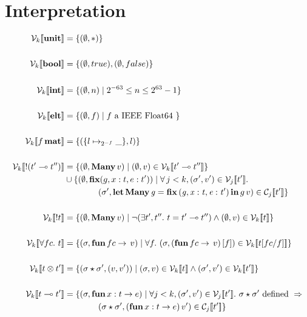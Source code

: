 \section{Interpretation}

\begin{align*}
  \V{k}{ \Unit } &= \{ (\empH, \ast) \} \\
\\
    \V{k}{ \Bool } &= \{ (\empH, true), (\empH, false) \} \\
\\
    \V{k}{ \Int } &= \{ (\empH, n) \mid 2^{-63} \leq n \leq 2^{63} -1 \} \\
\\
    \V{k}{ \Elt } &= \{ (\empH, f) \mid f \textrm{ a IEEE Float64 } \} \\
\\
    \V{k}{ f \, \Mat } &= \{ (\{ l \mapsto_{2^{-f}} \_ \} , l) \} \\
\\
    \V{k}{ \Bang (t' \multimap t'') } &= \{ (\empH, \Many\, v) \mid (\empH, v) \in \V{k}{ t' \multimap t'' } \} \\
                                      & \cup \{ (\empH, \ottkw{fix} (g, x : t, e : t')) \mid \forall \, j < k, (\sigma', v') \in \V{j}{ t' }.\\
                                      & \qquad \qquad (\sigma', \letManyG v) \in \C{j}{ t' } \} \\
\\
    \V{k}{ \Bang t } &= \{ (\empH, \Many\, v) \mid \neg (\exists t', t''.\ t = t' \multimap t'') \wedge (\empH, v) \in \V{k}{t} \} \\
\\
    \V{k}{ \forall fc.\  t } &= \{ (\sigma, \ottkw{fun}\, fc \rightarrow \, v) \mid \forall f.\ (\sigma, (\ottkw{fun}\, fc \rightarrow \, v)\, [ f ]) \in \V{k}{ t [ fc / f ] } \} \\
\\
    \V{k}{ t \otimes t' } &= \{ (\sigma \star \sigma', ( v, v' )) \mid (\sigma, v) \in \V{k}{t} \wedge (\sigma', v') \in \V{k}{t'} \} \\
\\
    \V{k}{ t \multimap t' } &= \{ (\sigma, \ottkw{fun}\, x : t \rightarrow e) \mid \forall j < k, (\sigma', v') \in \V{j}{ t' }.\ \sigma \star \sigma' \textrm{ defined } \Rightarrow \\
                            & \qquad \qquad (\sigma \star \sigma', (\ottkw{fun}\, x : t \rightarrow e)\, v') \in \C{j}{ t' } \} \\

\end{align*}
